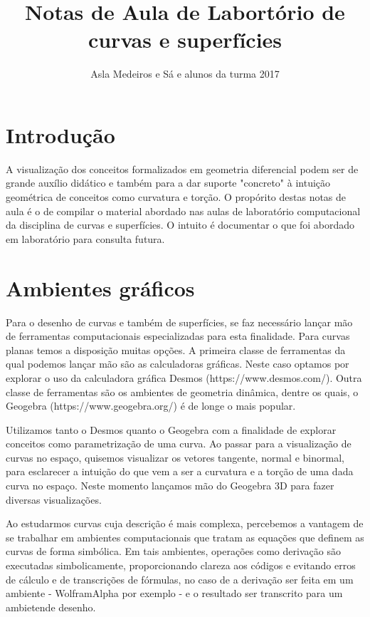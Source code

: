 \documentclass[a4paper]{article}
\title{Notas de Aula de Labortório de curvas e superfícies}
\author{Asla Medeiros e Sá e alunos da turma 2017}
\begin{document}
\maketitle 

\section{Introdução}

A visualização dos conceitos formalizados em geometria diferencial 
podem ser de grande auxílio didático e também para a dar suporte "concreto" à intuição geométrica de conceitos como curvatura e torção.  O propórito destas notas de aula é o de compilar o material abordado nas aulas de laboratório computacional da disciplina de curvas e superfícies. O intuito é documentar o que foi abordado em laboratório para consulta futura. 

\section{Ambientes gráficos}

Para o desenho de curvas e também de superfícies, se faz necessário lançar mão de ferramentas computacionais especializadas para esta finalidade. Para curvas planas temos a disposição muitas opções. A primeira classe de ferramentas da qual podemos lançar mão são as calculadoras gráficas. Neste caso optamos por explorar o uso da calculadora gráfica Desmos (https://www.desmos.com/). Outra classe de ferramentas são os ambientes de geometria dinâmica, dentre os quais, o Geogebra (https://www.geogebra.org/) é de longe o mais popular. 

Utilizamos tanto o Desmos quanto o Geogebra com a finalidade de explorar conceitos como parametrização de uma curva. Ao passar para a visualização de curvas no espaço, quisemos visualizar os vetores tangente, normal e binormal, para esclarecer a intuição do que vem a ser a curvatura e a torção de uma dada curva no espaço. Neste momento lançamos mão do Geogebra 3D para fazer diversas visualizações.

Ao estudarmos curvas cuja descrição é mais complexa, percebemos a vantagem de se trabalhar em ambientes computacionais que tratam as equações que definem as curvas de forma simbólica. Em tais ambientes, operações como derivação são executadas simbolicamente, proporcionando clareza aos códigos e evitando erros de cálculo e de transcrições de fórmulas, no caso de a derivação ser feita em um ambiente - WolframAlpha por exemplo - e o resultado ser transcrito para um ambietende desenho.
\end{document}
